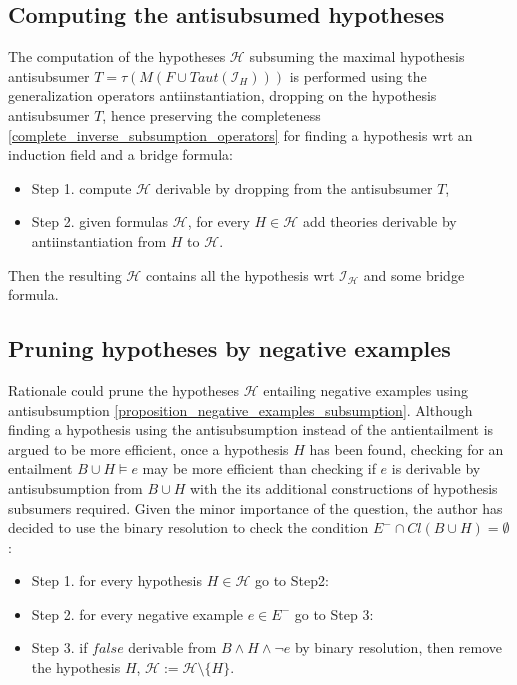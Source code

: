 \subsection{Computing the antisubsumed hypotheses}
The computation of the hypotheses $\mathcal{H}$ subsuming the maximal hypothesis  antisubsumer $T=\tau(M(F \cup Taut(\mathcal{I}_H)))$ is performed using the generalization operators\cite{yamamoto2008towards} antiinstantiation, dropping on the hypothesis antisubsumer $T$, hence preserving the completeness \ref{complete_inverse_subsumption_operators} for finding a hypothesis wrt an induction field and a bridge formula:

\begin{itemize}
\item Step 1. compute $\mathcal{H}$ derivable by dropping from the antisubsumer $T$,
\item Step 2. given formulas $\mathcal{H}$, for every $H \in \mathcal{H}$ add theories derivable by antiinstantiation from $H$ to $\mathcal{H}$.
\end{itemize}

Then the resulting $\mathcal{H}$ contains all the hypothesis wrt $\mathcal{I_H}$ and some bridge formula.

\subsection{Pruning hypotheses by negative examples}
Rationale could prune the hypotheses $\mathcal{H}$ entailing negative examples using antisubsumption \ref{proposition_negative_examples_subsumption}.
Although finding a hypothesis using the antisubsumption instead of the antientailment is argued to be more efficient\cite{yamamoto2012inverse}, once a hypothesis $H$ has been found, checking for an entailment $B \cup H \models e$ may be more efficient than checking if $e$ is derivable by antisubsumption from $B \cup H$ with the its additional constructions of hypothesis subsumers required. Given the minor importance of the question, the author has decided to use the binary resolution to check the condition $E^- \cap Cl(B \cup H)=\emptyset$:

\begin{itemize}
\item Step 1. for every hypothesis $H \in \mathcal{H}$ go to Step2:
\item Step 2. for every negative example $e \in E^-$ go to Step 3:
\item Step 3. if $false$ derivable from $B \land H \land \neg e$ by binary resolution, then remove the hypothesis $H$, $\mathcal{H}:=\mathcal{H} \setminus \{H\}$.
\end{itemize}

